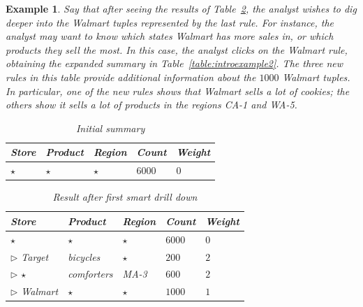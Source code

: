 \documentclass[10pt,journal,compsoc]{IEEEtran}
\newtheorem{example}[definition]{Example}
\begin{document}
\begin{example}
Say that after seeing the results of Table~\ref{table:introexample},
the analyst wishes to dig deeper into the Walmart tuples
represented by the last rule.
For instance, the analyst may want to know
which states Walmart has more sales in, or which products they sell
the most. In this case, the analyst clicks on the Walmart rule,
obtaining the expanded summary in Table~\ref{table:introexample2}.
The three new rules in this table provide additional information
about the $1000$ Walmart tuples.
In particular, one of the new rules shows that
Walmart sells a lot of cookies; the others show it sells a lot of products in
the regions CA-1 and WA-5.

\begin{table}
\scriptsize
\centering
\begin{tabular}{| l | l | l | l | l |}
\hline Store & Product & Region & Count & Weight \\
\hline
$\star$ & $\star$ & $\star$ & $6000$ & $0$ \\ \hline
\end{tabular}
\caption{Initial summary}\label{table:introexample0}
\vspace{-10pt}
\end{table}

\begin{table}
\scriptsize
\centering
\begin{tabular}{| l | l | l | l | l |}
\hline Store & Product & Region & Count & Weight \\
\hline
$\star$ & $\star$ & $\star$ & $6000$ & $0$ \\ \hline
$\triangleright$ Target & bicycles & $\star$ & $200$ & $2$ \\ \hline
$\triangleright$ $\star$ & comforters & MA-3 & $600$ & $2$ \\ \hline
$\triangleright$ Walmart & $\star$ & $\star$ & $1000$ & $1$ \\ \hline
\end{tabular}
\caption{Result after first smart drill down}\label{table:introexample}
\vspace{-20pt}
\end{table}


\end{example}
\end{document}
